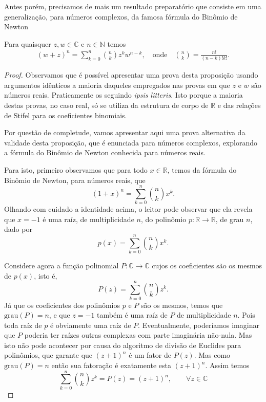 Antes porém, precisamos de mais um resultado preparatório
que consiste em uma generalização, para números complexos, 
da famosa fórmula do Binômio de Newton

\begin{proposicao}
\label{prop-binom-newton}
Para quaisquer $z,w\in\mathbb{C}$ e $n\in\mathbb{N}$ temos 
\begin{align}\label{eq-form-binom-newton}
(w+z)^n = \sum_{k=0}^n \binom{n}{k}z^{k}w^{n-k}, 
\quad \text{onde}\quad \binom{n}{k} = \frac{n!}{(n-k)!k!}.
\end{align}

\end{proposicao}
\begin{proof}
Observamos que é possível apresentar uma prova desta proposição 
usando argumentos idênticos a maioria
daqueles empregados nas provas em que $z$ e $w$ são 
números reais. Praticamente os seguindo \textit{ipsis litteris}.  
Isto porque a maioria destas provas, no caso real, 
só se utiliza da estrutura de corpo de $\mathbb{R}$
e das relações de Stifel para os coeficientes binomiais.

\medskip 

Por questão de completude, vamos apresentar aqui
uma prova alternativa da validade desta proposição,
que é enunciada para números complexos, explorando a fórmula do 
Binômio de Newton conhecida para números reais. 

Para isto, primeiro observamos que para todo $x\in\mathbb{R}$, temos
da fórmula do Binômio de Newton, para números reais, que
\[
(1+x)^n = \sum_{k=0}^n \binom{n}{k}x^k.
\]
Olhando com cuidado a identidade acima, o leitor pode observar que ela
revela que $x=-1$ é uma raíz, de 
multiplicidade $n$, do polinômio $p:\mathbb{R}\to\mathbb{R}$,
de grau $n$, dado por
\[
p(x) = \sum_{k=0}^n \binom{n}{k}x^k.
\]

Considere agora a função polinomial $P:\mathbb{C}\to\mathbb{C}$ 
cujos os coeficientes são os mesmos de $p(x)$, isto é, 
\[
P(z) = \sum_{k=0}^n \binom{n}{k}z^k.
\]
Já que os coeficientes dos polinômios $p$ e $P$ são os mesmos, temos que 
$\mathrm{grau}(P)=n$,
e que $z=-1$ também é uma raíz de $P$ de multiplicidade $n$.
Pois toda raíz de $p$ é obviamente uma raíz de $P$. Eventualmente, poderíamos imaginar que
$P$ poderia ter raízes outras complexas com parte imaginária  não-nula.
Mas isto não pode acontecer por causa do 
algoritmo de divisão de Euclides para polinômios,
que garante que $(z+1)^n$ é um fator de $P(z)$. 
Mas como $\mathrm{grau}(P)=n$ então sua fatoração é exatamente 
esta $(z+1)^n$. Assim temos
\[
\sum_{k=0}^n \binom{n}{k}z^k  = P(z) = (z+1)^n, \qquad \forall z\in\mathbb{C} 
\]


\end{proof}
